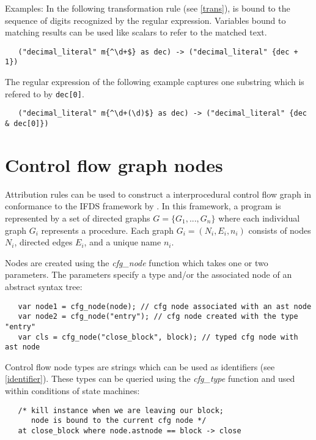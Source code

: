 Examples: In the following transformation rule
(see \ref{trans}),
 is bound to the sequence of digits recognized by the
regular expression. Variables bound to matching results can be
used like scalars to refer to the matched text.

\begin{lstlisting}
   ("decimal_literal" m{^\d+$} as dec) -> ("decimal_literal" {dec + 1})
\end{lstlisting}%

\noindent
The regular expression of the following example 
captures one substring which is refered to by \lstinline!dec[0]!.

\begin{lstlisting}
   ("decimal_literal" m{^\d+(\d)$} as dec) -> ("decimal_literal" {dec & dec[0]})
\end{lstlisting}%

\section{Control flow graph nodes}\label{cfg}

Attribution rules can be used to construct a interprocedural control
flow graph in conformance to the IFDS framework by
\cite{Reps:1995}. In this framework, a program is represented by a
set of directed graphs $G = \{G_1, ..., G_n\}$ where each individual
graph $G_i$ represents a procedure. Each graph $G_i = (N_i, E_i, n_i)$
consists of nodes $N_i$, directed edges $E_i$, and a unique name $n_i$.

Nodes are created using the \textit{cfg\_node} function
which takes one or two parameters. The parameters specify a type and/or
the associated node of an abstract syntax tree:

\begin{lstlisting}
   var node1 = cfg_node(node); // cfg node associated with an ast node
   var node2 = cfg_node("entry"); // cfg node created with the type "entry"
   var cls = cfg_node("close_block", block); // typed cfg node with ast node
\end{lstlisting}

Control flow node types are strings which
can be used as identifiers (see \ref{identifier}). These types can be
queried using the \textit{cfg\_type} function and used
within conditions of state machines:

\begin{lstlisting}
   /* kill instance when we are leaving our block;
      node is bound to the current cfg node */
   at close_block where node.astnode == block -> close
\end{lstlisting}

